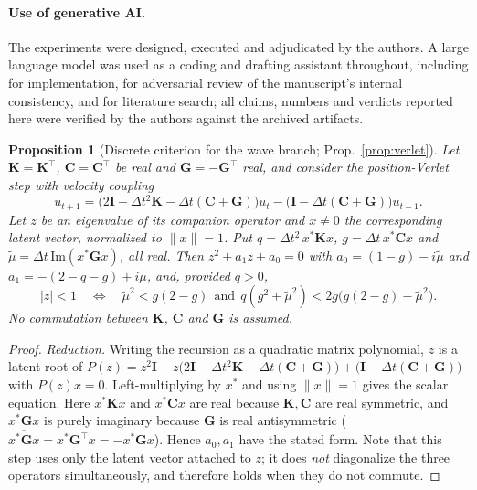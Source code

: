 \documentclass{article}
\newtheorem{proposition}{Proposition}
\begin{document}
{\paragraph{Use of generative AI.} The experiments were designed, executed and
adjudicated by the authors. A large language model was used as a coding and
drafting assistant throughout, including for implementation, for adversarial
review of the manuscript's internal consistency, and for literature search;
all claims, numbers and verdicts reported here were verified by the authors
against the archived artifacts.


\begin{proposition}[Discrete criterion for the wave branch; Prop.~\ref{prop:verlet}]
\label{prop:verlet-proof}
Let $\mathbf{K}=\mathbf{K}^\top$, $\mathbf{C}=\mathbf{C}^\top$ be real and
$\mathbf{G}=-\mathbf{G}^\top$ real, and consider the position-Verlet step with
velocity coupling
\[
u_{t+1}=\big(2\mathbf{I}-\Delta t^2\mathbf{K}-\Delta t(\mathbf{C}+\mathbf{G})\big)u_t
-\big(\mathbf{I}-\Delta t(\mathbf{C}+\mathbf{G})\big)u_{t-1}.
\]
Let $z$ be an eigenvalue of its companion operator and $x\neq0$ the
corresponding latent vector, normalized to $\lVert x\rVert=1$. Put
$q=\Delta t^2\,x^*\mathbf{K}x$, $g=\Delta t\,x^*\mathbf{C}x$ and
$\tilde\mu=\Delta t\,\mathrm{Im}(x^*\mathbf{G}x)$, all real. Then
$z^2+a_1z+a_0=0$ with $a_0=(1-g)-i\tilde\mu$ and
$a_1=-(2-q-g)+i\tilde\mu$, and, provided $q>0$,
\[
|z|<1\quad\Longleftrightarrow\quad
\tilde\mu^2<g(2-g)\ \ \text{and}\ \
q(g^2+\tilde\mu^2)<2g\big(g(2-g)-\tilde\mu^2\big).
\]
No commutation between $\mathbf{K}$, $\mathbf{C}$ and $\mathbf{G}$ is assumed.
\end{proposition}

\begin{proof}
\emph{Reduction.} Writing the recursion as a quadratic matrix polynomial,
$z$ is a latent root of
$P(z)=z^2\mathbf{I}-z\big(2\mathbf{I}-\Delta t^2\mathbf{K}-\Delta t(\mathbf{C}+\mathbf{G})\big)
+\big(\mathbf{I}-\Delta t(\mathbf{C}+\mathbf{G})\big)$
with $P(z)x=0$. Left-multiplying by $x^*$ and using $\lVert x\rVert=1$ gives the
scalar equation. Here $x^*\mathbf{K}x$ and $x^*\mathbf{C}x$ are real because
$\mathbf{K},\mathbf{C}$ are real symmetric, and $x^*\mathbf{G}x$ is purely
imaginary because $\mathbf{G}$ is real antisymmetric
($\overline{x^*\mathbf{G}x}=x^*\mathbf{G}^\top x=-x^*\mathbf{G}x$). Hence
$a_0,a_1$ have the stated form. Note that this step uses only the latent
vector attached to $z$; it does \emph{not} diagonalize the three operators
simultaneously, and therefore holds when they do not commute.


\end{proof}}
\end{document}
